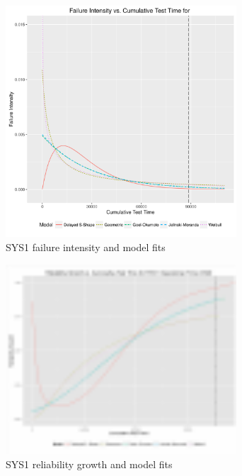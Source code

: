 \documentclass[journal]{IEEEtran}
\begin{document}
\begin{figure}[!h]
\centering
\includegraphics[width=3.4in]{Figures/FI}
\caption{SYS1 failure intensity and model fits}
\label{fig_FI}
\end{figure}

\begin{figure}[!h]
\centering
\includegraphics[width=3.4in]{Figures/Reliability_growth}
\caption{SYS1 reliability growth and model fits}
\label{fig_RG}
\end{figure}
\end{document}
